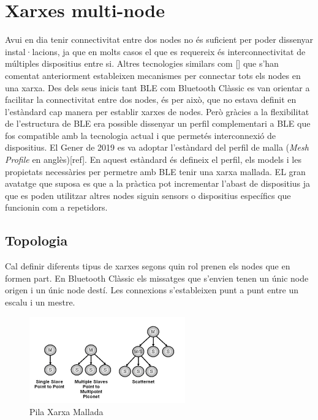 \section{Xarxes multi-node}
Avui en dia tenir connectivitat entre dos nodes no és suficient per poder dissenyar instal·lacions, ja que en molts casos el que es requereix és interconnectivitat de múltiples dispositius entre si.
Altres tecnologies similars com [] que s'han comentat anteriorment estableixen mecanismes per connectar tots els nodes en una xarxa.
Des dels seus inicis tant BLE com Bluetooth Clàssic es van orientar a facilitar la connectivitat entre dos nodes, és per això, que no estava definit en l'estàndard cap manera per establir xarxes de nodes.
Però gràcies a la flexibilitat de l'estructura de BLE era possible dissenyar un perfil complementari a BLE que fos compatible amb la tecnologia actual i que permetés interconnexió de dispositius.
El Gener de 2019 es va adoptar l'estàndard del perfil de malla (\textit{Mesh Profile} en anglès)[ref].
En aquest estàndard és defineix el perfil, els models i les propietats necessàries per permetre amb BLE tenir una xarxa mallada.
EL gran avatatge que suposa es que a la pràctica pot incrementar l'abast de dispositius ja que es poden utilitzar altres nodes siguin sensors o dispositius específics que funcionin com a repetidors.

\subsection{Topologia}
Cal definir diferents tipus de xarxes segons quin rol prenen els nodes que en formen part.
En Bluetooth Clàssic els missatges que s'envien tenen un únic node origen i un únic node destí.
Les connexions s'estableixen punt a punt entre un escalu i un mestre.

\begin{figure}[!h]
	\begin{center}
		\includegraphics[width=0.6\textwidth]{./images/scatternet.PNG}
		\caption{Pila Xarxa Mallada \cite{Mesh Profile}}
	\end{center}
\end{figure}

